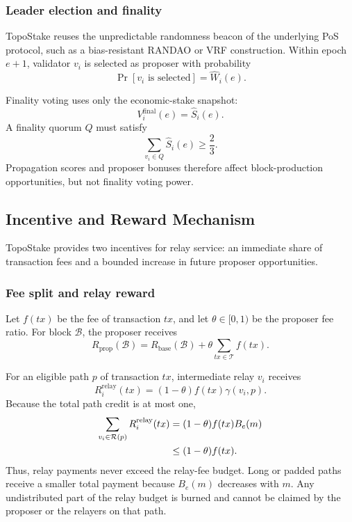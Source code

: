 \documentclass[lettersize,journal]{IEEEtran}
\begin{document}
\subsubsection{Leader election and finality}
TopoStake reuses the unpredictable randomness beacon of the underlying PoS protocol, such as a bias-resistant RANDAO or VRF construction.
Within epoch $e+1$, validator $v_i$ is selected as proposer with probability
\begin{equation}
\label{eq:leader_probability}
\Pr[v_i\text{ is selected}]
=
\hat W_i(e).
\end{equation}

Finality voting uses only the economic-stake snapshot:
\begin{equation}
\label{eq:finality_weight}
V_i^{\mathrm{final}}(e)
=
\hat S_i(e).
\end{equation}
A finality quorum $Q$ must satisfy
\begin{equation}
\label{eq:finality_quorum}
\sum_{v_i\in Q}\hat S_i(e)
\geq
\frac{2}{3}.
\end{equation}
Propagation scores and proposer bonuses therefore affect block-production opportunities, but not finality voting power.


\subsection{Incentive and Reward Mechanism}
\label{subsec:reward}

TopoStake provides two incentives for relay service:
an immediate share of transaction fees and a bounded increase in future proposer opportunities.

\subsubsection{Fee split and relay reward}
Let $f(tx)$ be the fee of transaction $tx$, and let $\theta\in[0,1)$ be the proposer fee ratio.
For block $\mathcal{B}$, the proposer receives
\begin{equation}
\label{eq:proposer_reward}
R_{\mathrm{prop}}(\mathcal{B})
=
R_{\mathrm{base}}(\mathcal{B})
+
\theta
\sum_{tx\in\mathcal{T}}f(tx).
\end{equation}

For an eligible path $p$ of transaction $tx$, intermediate relay $v_i$ receives
\begin{equation}
\label{eq:relay_reward}
R_i^{\mathrm{relay}}(tx)
=
(1-\theta)f(tx)\gamma(v_i,p).
\end{equation}
Because the total path credit is at most one,
\begin{align}
\label{eq:relay_reward_bound}
\sum_{v_i\in\mathcal{R}(p)}
R_i^{\mathrm{relay}}(tx)
&=
(1-\theta)f(tx)B_e(m) \notag\\
&\leq
(1-\theta)f(tx).
\end{align}
Thus, relay payments never exceed the relay-fee budget.
Long or padded paths receive a smaller total payment because $B_e(m)$ decreases with $m$.
Any undistributed part of the relay budget is burned and cannot be claimed by the proposer or the relayers on that path.
\end{document}

